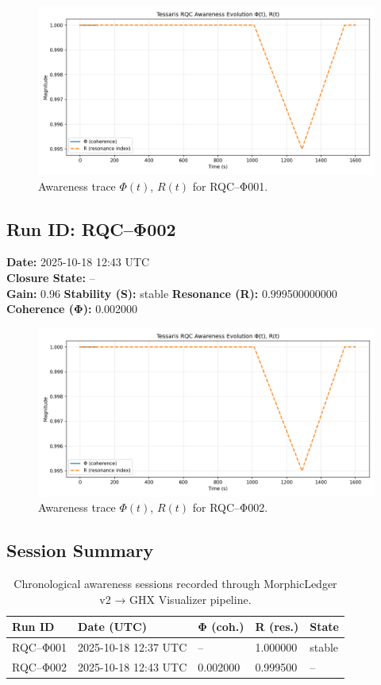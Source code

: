\begin{figure}[H]
\centering
\includegraphics[width=0.95\linewidth]{data/visualizations/awareness_sessions/awareness_20251018_123845.png}
\caption{Awareness trace $\Phi(t)$, $R(t)$ for RQC–Φ001.}
\end{figure}

\subsection*{Run ID: RQC–Φ002}
\textbf{Date:} 2025-10-18 12:43 UTC\\
\textbf{Closure State:} --\\
\textbf{Gain:} 0.96 \quad
\textbf{Stability (S):} stable \quad
\textbf{Resonance (R):} 0.999500000000 \\
\textbf{Coherence (Φ):} 0.002000\\

\begin{figure}[H]
\centering
\includegraphics[width=0.95\linewidth]{data/visualizations/awareness_sessions/awareness_20251018_123845.png}
\caption{Awareness trace $\Phi(t)$, $R(t)$ for RQC–Φ002.}
\end{figure}
\subsection*{Session Summary}
\begin{table}[H]
\centering
\begin{tabular}{lllll}
\toprule
Run ID & Date (UTC) & Φ (coh.) & R (res.) & State \\
\midrule
RQC–Φ001 & 2025-10-18 12:37 UTC & -- & 1.000000 & stable \\
RQC–Φ002 & 2025-10-18 12:43 UTC & 0.002000 & 0.999500 & -- \\
\bottomrule
\end{tabular}
\caption{Chronological awareness sessions recorded through MorphicLedger v2 → GHX Visualizer pipeline.}
\end{table}
